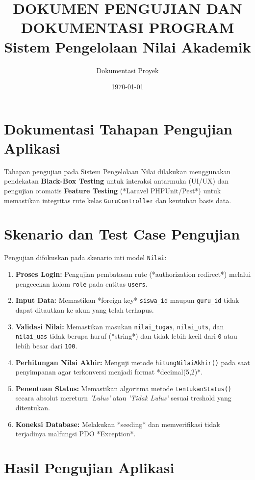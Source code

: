 \documentclass[12pt, a4paper]{article}
\title{\textbf{DOKUMEN PENGUJIAN DAN DOKUMENTASI PROGRAM\\ Sistem Pengelolaan Nilai Akademik}}
\author{Dokumentasi Proyek}
\date{\today}
\begin{document}
\maketitle
\tableofcontents
\newpage

\section{Dokumentasi Tahapan Pengujian Aplikasi}
Tahapan pengujian pada Sistem Pengelolaan Nilai dilakukan menggunakan pendekatan \textbf{Black-Box Testing} untuk interaksi antarmuka (UI/UX) dan pengujian otomatis \textbf{Feature Testing} (*Laravel PHPUnit/Pest*) untuk memastikan integritas rute kelas \texttt{GuruController} dan keutuhan basis data.

\section{Skenario dan Test Case Pengujian}
Pengujian difokuskan pada skenario inti model \texttt{Nilai}:
\begin{enumerate}
    \item \textbf{Proses Login:} Pengujian pembatasan rute (*authorization redirect*) melalui pengecekan kolom \texttt{role} pada entitas \texttt{users}.
    \item \textbf{Input Data:} Memastikan *foreign key* \texttt{siswa\_id} maupun \texttt{guru\_id} tidak dapat ditautkan ke akun yang telah terhapus.
    \item \textbf{Validasi Nilai:} Memastikan masukan \texttt{nilai\_tugas}, \texttt{nilai\_uts}, dan \texttt{nilai\_uas} tidak berupa huruf (*string*) dan tidak lebih kecil dari \texttt{0} atau lebih besar dari \texttt{100}.
    \item \textbf{Perhitungan Nilai Akhir:} Menguji metode \texttt{hitungNilaiAkhir()} pada saat penyimpanan agar terkonversi menjadi format *decimal(5,2)*.
    \item \textbf{Penentuan Status:} Memastikan algoritma metode \texttt{tentukanStatus()} secara absolut mereturn \textit{'Lulus'} atau \textit{'Tidak Lulus'} sesuai treshold yang ditentukan.
    \item \textbf{Koneksi Database:} Melakukan *seeding* dan memverifikasi tidak terjadinya malfungsi PDO *Exception*.
\end{enumerate}

\section{Hasil Pengujian Aplikasi}
\end{document}
